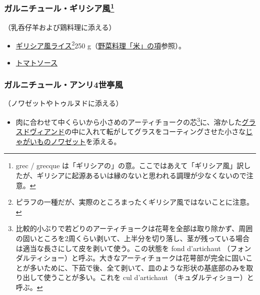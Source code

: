 \begin{recette}
\hypertarget{garniture-a-la-grecque}{%
\subsubsection[ガルニチュール・ギリシア風]{\texorpdfstring{ガルニチュール・ギリシア風\footnote{grec
  / grecque
  は「ギリシアの」の意。ここではあえて「ギリシア風」訳したが、ギリシアに起源あるいは縁のないと思われる調理が少なくないので注意。}}{ガルニチュール・ギリシア風}}\label{garniture-a-la-grecque}}



（乳呑仔羊および鶏料理に添える）

\begin{itemize}
\item
  \protect\hyperlink{riz-a-la-grecque}{ギリシア風ライス}\footnote{ピラフの一種だが、実際のところまったくギリシア風ではないことに注意。}250
  g（\protect\hyperlink{riz}{野菜料理「米」の項}参照）。
\item
  \protect\hyperlink{sauce-tomate}{トマトソース}
\end{itemize}

\hypertarget{garniture-henri-iv}{%
\subsubsection{ガルニチュール・アンリ4世亭風}\label{garniture-henri-iv}}



（ノワゼットやトゥルヌドに添える）

\begin{itemize}
\tightlist
\item
  肉に合わせて中くらいから小さめのアーティチョークの芯\footnote{比較的小ぶりで若どりのアーティチョークは花萼を全部は取り除かず、周囲の固いところを2周くらい剥いて、上半分を切り落し、茎が残っている場合は適当な長さにして皮を剥いて使う。この状態を
    fond d'artichaut
    （フォンダルティショー）と呼ぶ。大きなアーティチョークは花萼部が完全に固いことが多いために、下茹で後、全て剥いて、皿のような形状の基底部のみを取り出して使うことが多い。これを
    cul d'artichaut （キュダルティショー）と呼ぶ。}に、溶かした\protect\hyperlink{glace-de-viande}{グラスドヴィアンド}の中に入れて転がしてグラスをコーティングさせた小さな\protect\hyperlink{pommes-de-terre-noisette}{じゃがいものノワゼット}を添える。
\end{itemize}
\end{recette}